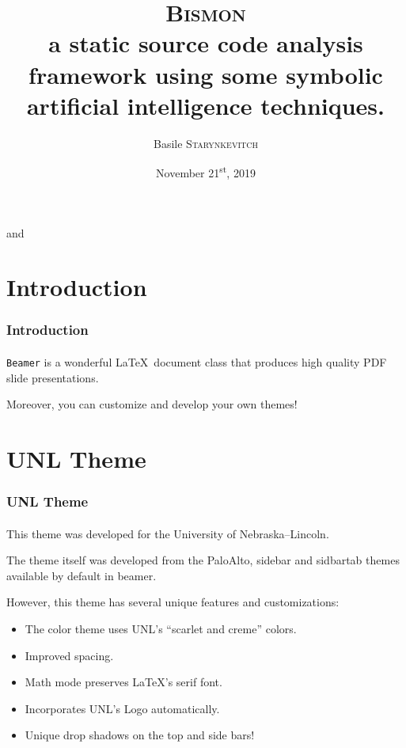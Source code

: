 \documentclass{beamer}
\title{\textsc{Bismon} \\
a static source code analysis framework using some symbolic artificial intelligence techniques.}
\author{Basile \textsc{Starynkevitch}} %
\institute{CEA/LIST (DILS) - laboratoire de Sûreté des Logiciels}
\date{November 21\textsuperscript{st}, 2019}
\begin{document}
\begin{frame}
        \titlepage
        \begin{center}
    \href{mailto:basile.starynkevitch@cea.fr}{} and \href{mailto:basile@starynkevitch.net}{}
        \end{center}
\end{frame}


\section{Introduction}

\begin{frame}
    \frametitle{Introduction}
    \framesubtitle{}

    \texttt{Beamer} is a wonderful \LaTeX\ document class that produces
    high quality PDF slide presentations.
    
    Moreover, you can customize and develop your own themes!

\end{frame}

\section{UNL Theme}    

\begin{frame}
    \frametitle{UNL Theme}
    \framesubtitle{}

    This theme was developed for the University of Nebraska--Lincoln.
    
    The theme itself was developed from the PaloAlto, sidebar and sidbartab
    themes available by default in beamer.
    
    However, this theme has several unique features and customizations:
    \begin{itemize}
      \item The color theme uses UNL's ``scarlet and creme'' colors.
      \item Improved spacing.
      \item Math mode preserves \LaTeX's serif font.
      \item Incorporates UNL's Logo automatically.
      \item Unique drop shadows on the top and side bars!
    \end{itemize}

\end{frame}
\end{document}
